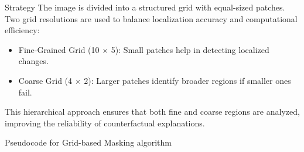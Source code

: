 Strategy
The image is divided into a structured grid with equal-sized patches. Two grid resolutions are used to balance localization accuracy and computational efficiency:
\begin{itemize}
    \item Fine-Grained Grid (10 × 5): Small patches help in detecting localized changes.
    \item Coarse Grid (4 × 2): Larger patches identify broader regions if smaller ones fail.
\end{itemize}
This hierarchical approach ensures that both fine and coarse regions are analyzed, improving the reliability of counterfactual explanations.

Pseudocode for Grid-based Masking algorithm

